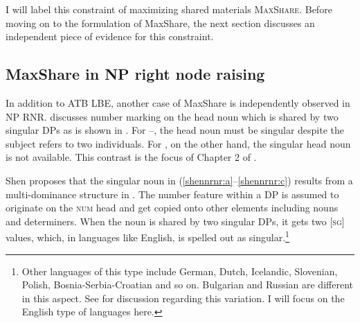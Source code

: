 \documentclass[output=paper]{langscibook}
\begin{document}
I will label this constraint of maximizing shared materials \textsc{MaxShare}. Before moving on to the formulation of MaxShare, the next section discusses an independent piece of evidence for this constraint.

\subsection{MaxShare in NP right node raising}
\label{shensect:rnr}

In addition to ATB LBE, another case of MaxShare is independently observed in NP RNR.
\citet{Shen:2018a} discusses number marking on the head noun which is shared by two singular DPs as is shown in . 
For --, the head noun must be singular despite the subject refers to two individuals. 
For , on the other hand, the singular head noun is not available. 
This contrast is the focus of Chapter 2 of \citet{Shen:2018a}.

\ea 
	\label{shennrnr}
	\z 
\z 
{}
Shen proposes that the singular noun in (\ref{shennrnr:a}--\ref{shennrnr:c}) results from a multi-dominance structure in . The number feature within a DP is assumed to originate on the \textsc{num} head and get copied onto other elements including nouns and determiners. When the noun is shared by two singular DPs, it gets two [\textsc{sg}] values, which, in languages like English, is spelled out as singular.\footnote{Other languages of this type include German, Dutch, Icelandic, Slovenian, Polish, Bosnia-Serbia-Croatian and so on. Bulgarian and Russian are different in this aspect. See \citet{Shen:2019} for discussion regarding this variation. I will focus on the English type of languages here.} 


%
\end{document}
